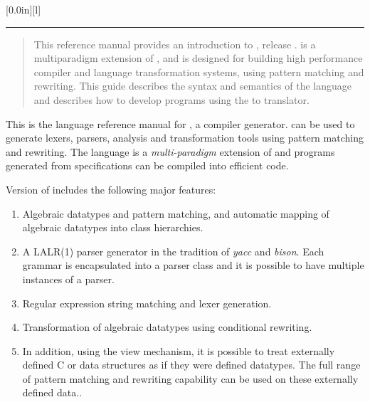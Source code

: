    \setlength{\textwidth}{6.6in}
   \setlength{\evensidemargin}{0in}
   \setlength{\oddsidemargin}{0in}
   \setlength{\textheight}{8.75in}
   \setlength{\topmargin}{-0.5in}
   \setlength{\parskip}{1mm}
   \setlength{\parindent}{3ex}
   \setlength{\itemsep}{0.5ex}

   \newsavebox{\LINE}
   \savebox{\LINE}[0.0in][l]{\rule[-1ex]{\textwidth}{.01in}}


   \maketitle
   \vspace{\fill}

   \begin{abstract}
    This reference manual provides an introduction to
    \Prop, release \Version.  \Prop{} is a multiparadigm extension of \Cpp,  
    and is designed for building high performance compiler 
    and language transformation systems, using pattern matching and rewriting.  
    This guide describes the syntax and semantics of
    the \Prop{} language and describes how to develop programs
    using the \Prop{} to \Cpp{} translator.

   \end{abstract}
   \warning
   \titlepage
   \tableofcontents
   

 \label{sec:intro}
 
   This is the language reference manual for \Prop, a compiler generator.
\Prop{} can be used to generate lexers, parsers, analysis and 
transformation tools using pattern matching and rewriting.  
The \Prop{} language is a {\em multi-paradigm} 
extension of \Cpp\cite{C++} and
\Cpp{} programs generated from \Prop{} specifications can be compiled
into efficient code.

   Version \Version{} of \Prop{} includes the following major features:
\begin{enumerate}
   \item Algebraic datatypes and pattern matching, and automatic
mapping of algebraic datatypes into \Cpp{} class hierarchies.
   \item A LALR(1) parser generator in the tradition of {\it yacc} and
{\it bison}.  Each grammar is encapsulated into a parser class and 
it is possible to have multiple instances of a parser.
   \item Regular expression string matching and lexer generation.
   \item Transformation of algebraic datatypes using conditional
   rewriting.
   \item In addition, using the view mechanism, 
it is possible to treat externally defined C or \Cpp{}
data structures as if they were \Prop{} defined datatypes.  
The full range of pattern matching and rewriting capability can
be used on these externally defined data..
\end{enumerate}

